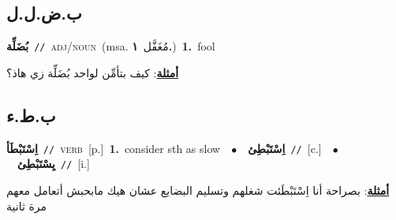 \documentclass[10pt,a4paper,twoside]{article} %
\begin{document}
\begin{multicols}{2}
\vspace{-3mm}
\subsection*{\color{blue}\foreignlanguage{arabic}{ب.ض.ل.ل}\color{blue}{ (ntws)}} 

{\setlength\topsep{0pt}\textbf{\foreignlanguage{arabic}{بُضَلِّة}}\ {\color{gray}\texttt{//}\color{black}}\ \textsc{adj/noun}\ \color{gray}(msa. \foreignlanguage{arabic}{مُغَفَّل}~\foreignlanguage{arabic}{\textbf{١.}})\color{black}\ \textbf{1.}~fool\  \begin{flushright}\color{gray}\foreignlanguage{arabic}{\textbf{\underline{\foreignlanguage{arabic}{أمثلة}}}: كيف بتأمِّن لواحد بُضَلِّة  زي هاذ؟}\end{flushright}\color{black}} \vspace{2mm}

\vspace{-3mm}
\subsection*{\color{blue}\foreignlanguage{arabic}{ب.ط.ء}\color{blue}{}} 

{\setlength\topsep{0pt}\textbf{\foreignlanguage{arabic}{اِسْتَبْطَأ}}\ {\color{gray}\texttt{//}\color{black}}\ \textsc{verb}\ [p.]\ \textbf{1.}~consider sth as slow\ \ $\bullet$\ \ \setlength\topsep{0pt}\textbf{\foreignlanguage{arabic}{اِسْتَبْطِئ}}\ {\color{gray}\texttt{//}\color{black}}\ [c.]\ \ $\bullet$\ \ \setlength\topsep{0pt}\textbf{\foreignlanguage{arabic}{يِسْتَبْطِئ}}\ {\color{gray}\texttt{//}\color{black}}\ [i.]\  \begin{flushright}\color{gray}\foreignlanguage{arabic}{\textbf{\underline{\foreignlanguage{arabic}{أمثلة}}}: بصراحة أنا اِسْتَبْطَئت شغلهم وتسليم البضايع عشان هيك مابحبش أتعامل معهم مرة ثانية}\end{flushright}\color{black}} \vspace{2mm}


\end{multicols}
\end{document}
